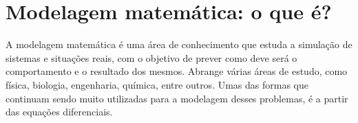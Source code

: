 \chapter*[Modelagem matemática: o que é?]{Modelagem matemática: o que é?}
A modelagem matemática é uma área de conhecimento que estuda a simulação de sistemas e situações reais, com o objetivo de prever como deve será o comportamento e o resultado dos mesmos. Abrange várias áreas de estudo, como física, biologia, engenharia, química, entre outros. Umas das formas que continuam sendo muito utilizadas para a modelagem desses problemas, é a partir das equações diferenciais.